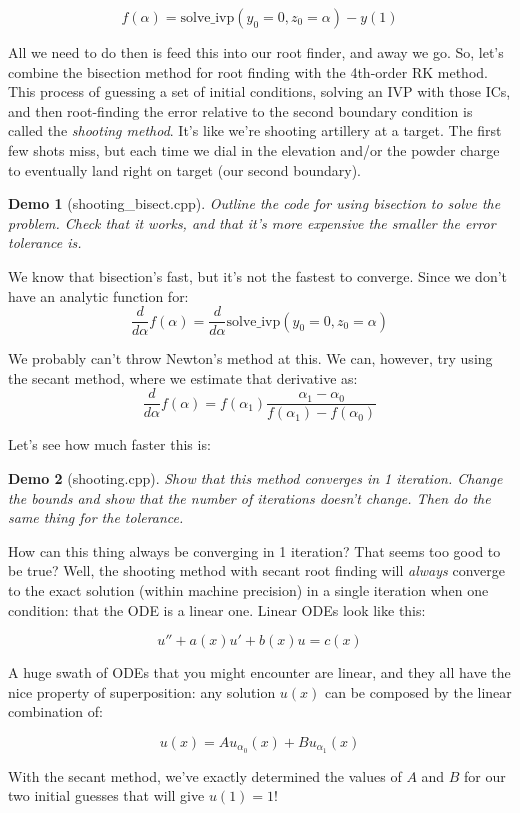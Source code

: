 \documentclass{article}
\theoremstyle{demo}
\newtheorem{demo}{Demo}[section]
\begin{document}
\begin{equation}
    f(\alpha) = \mathrm{solve\_ivp}(y_0=0,z_0=\alpha) - y(1)
\end{equation}

All we need to do then is feed this into our root finder, and away we go.  So,
let's combine the bisection method for root finding with the 4th-order RK
method.  This process of guessing a set of initial conditions, solving an IVP
with those ICs, and then root-finding the error relative to the second boundary
condition is called the \textit{shooting method}.  It's like we're shooting
artillery at a target.  The first few shots miss, but each time we dial in the
elevation and/or the powder charge to eventually land right on target (our
second boundary).

\begin{demo}[shooting\_bisect.cpp]
    Outline the code for using bisection to solve the problem.  Check that it
    works, and that it's more expensive the smaller the error tolerance is.
\end{demo}

We know that bisection's fast, but it's not the fastest to converge.  Since we
don't have an analytic function for:
\begin{equation}
    \frac{d}{d\alpha}f(\alpha) = \frac{d}{d\alpha} \mathrm{solve\_ivp}(y_0=0,z_0=\alpha) 
\end{equation}

We probably can't throw Newton's method at this.  We can, however, try using the
secant method, where we estimate that derivative as:
\begin{equation}
    \frac{d}{d\alpha}f(\alpha) = f(\alpha_{1})\frac{\alpha_{1} -
    \alpha_{0}}{f(\alpha_1)-f(\alpha_0)}
\end{equation}

Let's see how much faster this is:
\begin{demo}[shooting.cpp]
    Show that this method converges in 1 iteration.  Change the bounds and show
    that the number of iterations doesn't change.  Then do the same thing for
    the tolerance.
\end{demo}

How can this thing always be converging in 1 iteration?  That seems too good to
be true?  Well, the shooting method with secant root finding will
\textit{always} converge to the exact solution (within machine precision) in a
single iteration when one condition: that the ODE is a linear one.  Linear ODEs
look like this:

\begin{equation}
    u'' + a(x)u' + b(x)u = c(x)
\end{equation}

A huge swath of ODEs that you might encounter are linear, and they all have the
nice property of superposition: any solution $u(x)$ can be composed by the
linear combination of:

\begin{equation}
    u(x) = Au_{\alpha_0}(x) + Bu_{\alpha_1}(x)
\end{equation}

With the secant method, we've exactly determined the values of $A$ and $B$ for
our two initial guesses that will give $u(1) = 1$!
\end{document}
